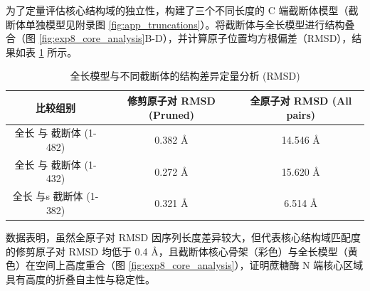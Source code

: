 \documentclass[10.5pt, a4paper]{ctexart}
\begin{document}
为了定量评估核心结构域的独立性，构建了三个不同长度的 C 端截断体模型（截断体单独模型见附录图 \ref{fig:app_truncations}）。将截断体与全长模型进行结构叠合（图 \ref{fig:exp8_core_analysis}B-D），并计算原子位置均方根偏差（RMSD），结果如表 \ref{tab:exp8_rmsd} 所示。

\begin{table}[H]
    \centering
    \caption{全长模型与不同截断体的结构差异定量分析 (RMSD)}
    \label{tab:exp8_rmsd}
    \begin{tabular}{ccc}
        \toprule
        \textbf{比较组别} & \textbf{修剪原子对 RMSD (Pruned)} & \textbf{全原子对 RMSD (All pairs)} \\
        \midrule
        全长 与 截断体 (1-482) & 0.382 \si{\angstrom} & 14.546 \si{\angstrom} \\
        全长 与 截断体 (1-432) & 0.272 \si{\angstrom} & 15.620 \si{\angstrom} \\
        全长 与s 截断体 (1-382) & 0.321 \si{\angstrom} & 6.514 \si{\angstrom} \\
        \bottomrule
    \end{tabular}
\end{table}

数据表明，虽然全原子对 RMSD 因序列长度差异较大，但代表核心结构域匹配度的修剪原子对 RMSD 均低于 0.4 \si{\angstrom}，且截断体核心骨架（彩色）与全长模型（黄色）在空间上高度重合（图 \ref{fig:exp8_core_analysis}），证明蔗糖酶 N 端核心区域具有高度的折叠自主性与稳定性。
\end{document}
